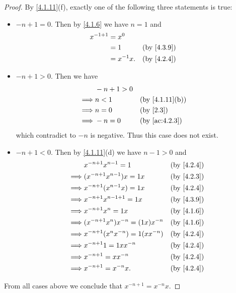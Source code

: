 \begin{proof}
  By \cref{4.1.11}(f), exactly one of the following three statements is true:
  \begin{itemize}
    \item \(-n + 1 = 0\).
          Then by \cref{4.1.6} we have \(n = 1\) and
          \begin{align*}
            x^{-1 + 1} & = x^0                       \\
                       & = 1         &  & \by{4.3.9} \\
                       & = x^{-1} x. &  & \by{4.2.4}
          \end{align*}
    \item \(-n + 1 > 0\).
          Then we have
          \begin{align*}
                     & -n + 1 > 0                                   \\
            \implies & n < 1      &  & \text{(by \cref{4.1.11}(b))} \\
            \implies & n = 0      &  & \text{(by \cref{2.3})}       \\
            \implies & -n = 0     &  & \by{ac:4.2.3}
          \end{align*}
          which contradict to \(-n\) is negative.
          Thus this case does not exist.
    \item \(-n + 1 < 0\).
          Then by \cref{4.1.11}(d) we have \(n - 1 > 0\) and
          \begin{align*}
                     & x^{-n + 1} x^{n - 1} = 1              &  & \by{4.2.4} \\
            \implies & (x^{-n + 1} x^{n - 1}) x = 1x         &  & \by{4.2.3} \\
            \implies & x^{-n + 1} (x^{n - 1} x) = 1x         &  & \by{4.2.4} \\
            \implies & x^{-n + 1} x^{n - 1 + 1} = 1x         &  & \by{4.3.9} \\
            \implies & x^{-n + 1} x^n = 1x                   &  & \by{4.1.6} \\
            \implies & (x^{-n + 1} x^n) x^{-n} = (1x) x^{-n} &  & \by{4.1.6} \\
            \implies & x^{-n + 1} (x^n x^{-n}) = 1(x x^{-n}) &  & \by{4.2.4} \\
            \implies & x^{-n + 1} 1 = 1x x^{-n}              &  & \by{4.2.4} \\
            \implies & x^{-n + 1} = x x^{-n}                 &  & \by{4.2.4} \\
            \implies & x^{-n + 1} = x^{-n} x.                &  & \by{4.2.4}
          \end{align*}
  \end{itemize}
  From all cases above we conclude that \(x^{-n + 1} = x^{-n} x\).
\end{proof}

